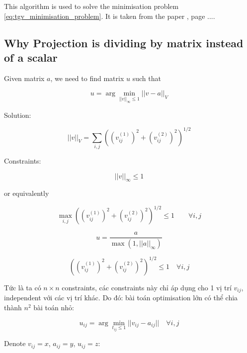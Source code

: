 \documentclass{article}
\begin{document}
This algorithm is used to solve the minimisation problem \ref{eq:tgv_minimisation_problem}.
It is taken from the paper \cite{recovering_piecewise_smooth_multichannel_images}, page ....


\subsection{Why Projection is dividing by matrix instead of a scalar}


Given matrix $a$, we need to find matrix $u$ such that

\begin{equation}
    u = \arg \min_{|| v ||_\infty \leq 1} || v - a ||_V
\end{equation}

Solution:

\begin{equation}
    ||v||_V = \sum_{i,j} \left( \left(v_{ij}^{(1)}\right)^2 + \left(v_{ij}^{(2)}\right)^2 \right)^{1/2}
\end{equation}

Constraints:

\begin{equation}
    ||v||_\infty \leq 1
\end{equation}

or equivalently

\begin{equation}
    \max_{i,j} \left( \left(v_{ij}^{(1)}\right)^2 + \left(v_{ij}^{(2)}\right)^2 \right)^{1/2} \leq 1  \quad  \quad  \forall i, j
\end{equation}

\begin{equation}
    u = \frac{a}{\max(1, ||a||_\infty)}
\end{equation}

\begin{equation}
((v_{ij}^{(1)})^2 + (v_{ij}^{(2)})^2)^{1/2} \leq 1 \quad \forall i, j
\end{equation}

Tức là ta có $n \times n$ constraints,
các constraints này chỉ áp dụng cho 1 vị trí $v_{ij}$,
independent với các vị trí khác.
Do đó: bài toán optimisation lớn có thể chia thành $n^2$ bài toán nhỏ:

\begin{equation}
u_{ij} = \arg \min_{t_{ij} \leq 1} || v_{ij} - a_{ij} ||  \quad \forall i, j
\end{equation}

Denote $v_{ij} = x$, $a_{ij} = y$, $u_{ij} = z$:
\end{document}
